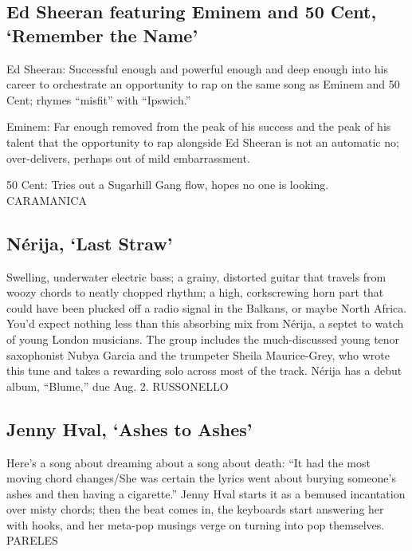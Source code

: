 \hypertarget{ed-sheeran-featuring-eminem-and-50-cent-remember-the-name}{%
\subsection{Ed Sheeran featuring Eminem and 50 Cent, `Remember the
Name'}\label{ed-sheeran-featuring-eminem-and-50-cent-remember-the-name}}

Ed Sheeran: Successful enough and powerful enough and deep enough into
his career to orchestrate an opportunity to rap on the same song as
Eminem and 50 Cent; rhymes ``misfit'' with ``Ipswich.''

Eminem: Far enough removed from the peak of his success and the peak of
his talent that the opportunity to rap alongside Ed Sheeran is not an
automatic no; over-delivers, perhaps out of mild embarrassment.

50 Cent: Tries out a Sugarhill Gang flow, hopes no one is looking.
CARAMANICA

\hypertarget{nuxe9rija-last-straw}{%
\subsection{Nérija, `Last Straw'}\label{nuxe9rija-last-straw}}

Swelling, underwater electric bass; a grainy, distorted guitar that
travels from woozy chords to neatly chopped rhythm; a high, corkscrewing
horn part that could have been plucked off a radio signal in the
Balkans, or maybe North Africa. You'd expect nothing less than this
absorbing mix from Nérija, a septet to watch of young London musicians.
The group includes the much-discussed young tenor saxophonist Nubya
Garcia and the trumpeter Sheila Maurice-Grey, who wrote this tune and
takes a rewarding solo across most of the track. Nérija has a debut
album, ``Blume,'' due Aug. 2. RUSSONELLO

\hypertarget{jenny-hval-ashes-to-ashes}{%
\subsection{Jenny Hval, `Ashes to
Ashes'}\label{jenny-hval-ashes-to-ashes}}

Here's a song about dreaming about a song about death: ``It had the most
moving chord changes/She was certain the lyrics went about burying
someone's ashes and then having a cigarette.'' Jenny Hval starts it as a
bemused incantation over misty chords; then the beat comes in, the
keyboards start answering her with hooks, and her meta-pop musings verge
on turning into pop themselves. PARELES

